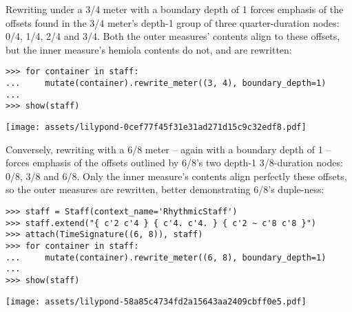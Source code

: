 \noindent Rewriting under a 3/4 meter with a boundary depth of 1 forces
emphasis of the offsets found in the 3/4 meter's depth-1 group of three
quarter-duration nodes: 0/4, 1/4, 2/4 and 3/4. Both the outer measures'
contents align to these offsets, but the inner measure's hemiola contents do
not, and are rewritten:

\begin{comment}
<abjad>
for container in staff:
    mutate(container).rewrite_meter((3, 4), boundary_depth=1)

show(staff)
</abjad>
\end{comment}

\begin{abjadbookoutput}
\begin{singlespacing}
\vspace{-0.5\baselineskip}
\begin{lstlisting}
>>> for container in staff:
...     mutate(container).rewrite_meter((3, 4), boundary_depth=1)
...
>>> show(staff)
\end{lstlisting}
\noindent\texttt{[image: assets/lilypond-0cef77f45f31e31ad271d15c9c32edf8.pdf]}
\end{singlespacing}
\end{abjadbookoutput}

\noindent Conversely, rewriting with a 6/8 meter -- again with a boundary depth
of 1 -- forces emphasis of the offsets outlined by 6/8's two depth-1
3/8-duration nodes: 0/8, 3/8 and 6/8. Only the inner measure's contents align
perfectly these offsets, so the outer measures are rewritten, better
demonstrating 6/8's duple-ness:

\begin{comment}
<abjad>
staff = Staff(context_name='RhythmicStaff')
staff.extend("{ c'2 c'4 } { c'4. c'4. } { c'2 ~ c'8 c'8 }")
attach(TimeSignature((6, 8)), staff)
for container in staff:
    mutate(container).rewrite_meter((6, 8), boundary_depth=1)

show(staff)
</abjad>
\end{comment}

\begin{abjadbookoutput}
\begin{singlespacing}
\vspace{-0.5\baselineskip}
\begin{lstlisting}
>>> staff = Staff(context_name='RhythmicStaff')
>>> staff.extend("{ c'2 c'4 } { c'4. c'4. } { c'2 ~ c'8 c'8 }")
>>> attach(TimeSignature((6, 8)), staff)
>>> for container in staff:
...     mutate(container).rewrite_meter((6, 8), boundary_depth=1)
...
>>> show(staff)
\end{lstlisting}
\noindent\texttt{[image: assets/lilypond-58a85c4734fd2a15643aa2409cbff0e5.pdf]}
\end{singlespacing}
\end{abjadbookoutput}

